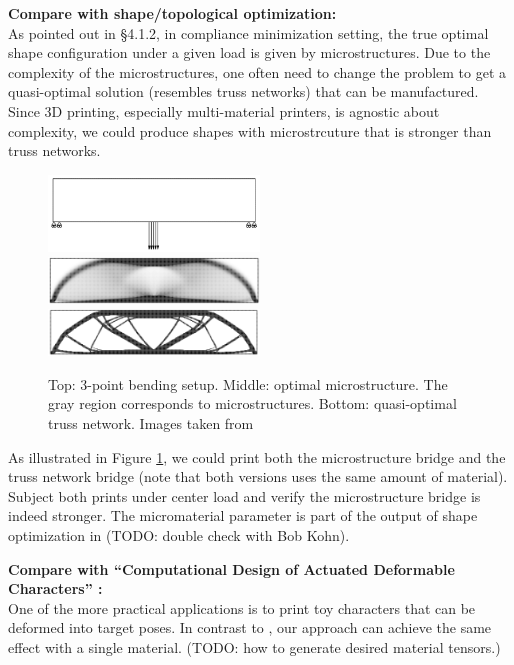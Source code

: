 \begin{description}
\item{\bf Compare with shape/topological optimization:}\\
As pointed out in \cite{allaire2002shape} \S 4.1.2, in compliance minimization
setting, the true optimal shape configuration under a given load is given by
microstructures.  Due to the complexity of the microstructures, one often need
to change the problem to get a quasi-optimal solution (resembles truss
networks) that can be manufactured.  Since 3D printing, especially
multi-material printers, is agnostic about complexity, we could produce shapes
with microstrcuture that is stronger than truss networks.

\begin{figure}
\centering
\includegraphics[width=0.5\textwidth]{images/3pt_bending}\\
\includegraphics[width=0.5\textwidth]{images/micro_struct_bridge}\\
\includegraphics[width=0.5\textwidth]{images/truss_network_bridge}\\
\caption{Top: 3-point bending setup.  Middle: optimal microstructure.  The gray
region corresponds to microstructures.  Bottom:
quasi-optimal truss network.  Images taken from \cite{allaire1996homogenization}}
\label{fig:3pt_bending}
\end{figure}

As illustrated in Figure \ref{fig:3pt_bending}, we could print both the
microstructure bridge and the truss network bridge (note that both versions uses
the same amount of material).  Subject both prints under center load and verify
the microstructure bridge is indeed stronger.  The micromaterial parameter is
part of the output of shape optimization in \cite{allaire1996homogenization}
(TODO: double check with Bob Kohn).

\item{\bf Compare with ``Computational Design of Actuated Deformable
Characters''
\cite{Skouras:2013}:}\\
One of the more practical applications is to print toy characters that can be
deformed into target poses.  In contrast to \cite{Skouras:2013}, our approach
can achieve the same effect with a single material.
(TODO: how to generate desired material tensors.)


\end{description}

